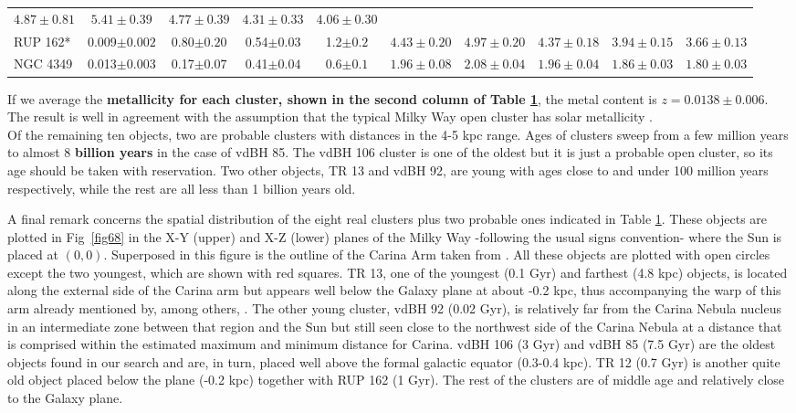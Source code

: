 \documentclass[referee]{aa}
\begin{document}
\begin{table}[ht]
\begin{tabular}{lccccccccc}
 $4.87\pm0.81$ & $5.41\pm0.39$ & $4.77\pm0.39$ & $4.31\pm0.33$ & $4.06\pm0.30$\\
 RUP 162* & 0.009$\pm0.002$ & 0.80$\pm0.20$ & 0.54$\pm0.03$ & 1.2$\pm0.2$ &
 $4.43\pm0.20$ & $4.97\pm0.20$ & $4.37\pm0.18$ & $3.94\pm0.15$ & $3.66\pm0.13$\\
 NGC 4349 & 0.013$\pm0.003$ & 0.17$\pm0.07$ & 0.41$\pm0.04$ & 0.6$\pm0.1$ &
 $1.96\pm0.08$ & $2.08\pm0.04$ & $1.96\pm0.04$ & $1.86\pm0.03$ & $1.80\pm0.03$\\
\hline
\end{tabular}
\label{tab:final_tab}
\end{table}

If we average the \textbf{metallicity for each cluster, shown in the second
column of Table \ref{tab:final_tab}}, the metal content is $z=0.0138\pm0.006$.
The result is well in agreement with the assumption that the typical Milky Way
open cluster has solar metallicity \citep[$z=0.0152$,][]{Bressan_2012}.\\

Of the remaining ten objects, two are probable clusters with distances in the
4-5 kpc range. Ages of clusters sweep from a few million years
to almost 8 \textbf{billion years} in the case of vdBH 85. The vdBH 106 cluster
is one of the oldest but it is just a probable open cluster, so its age should
be taken with reservation. Two other objects, TR 13 and vdBH 92, are young with
ages close to and under 100 million years respectively, while the rest are all
less than 1 billion years old.

A final remark concerns the spatial distribution of the
eight real clusters plus two probable ones indicated in Table 
\ref{tab:final_tab}. These objects  are plotted in Fig~\ref{fig68} in the X-Y
(upper) and X-Z (lower) planes of the Milky Way -following the usual signs
convention- where the Sun is placed at $(0, 0)$. Superposed in this
figure is the outline of the Carina Arm taken from \cite{valle_2005}. All
these objects are plotted with open circles except the two youngest,
which are shown with red squares. TR 13, one of the youngest (0.1 Gyr)
and farthest (4.8 kpc) objects, is located along the external side of the
Carina arm but appears well below the Galaxy plane at about -0.2 kpc, thus
accompanying the warp of this arm already mentioned by, among others,
\cite{Cersosimo_2009}. 
The other young cluster, vdBH 92 (0.02 Gyr), is relatively far from the Carina
Nebula nucleus in an intermediate zone between that region and the Sun but
still seen close to the northwest side of the Carina Nebula at a distance
that is comprised within the estimated maximum and minimum distance for Carina.
vdBH 106 (3 Gyr) and vdBH 85 (7.5 Gyr) are the oldest objects found in our
search and are, in turn, placed well above the formal galactic equator (0.3-0.4
kpc). TR 12 (0.7 Gyr) is another quite old object placed below the plane (-0.2
kpc) together with RUP 162 (1 Gyr). The rest of the clusters are of middle age
and relatively close to the Galaxy plane.
\end{document}
